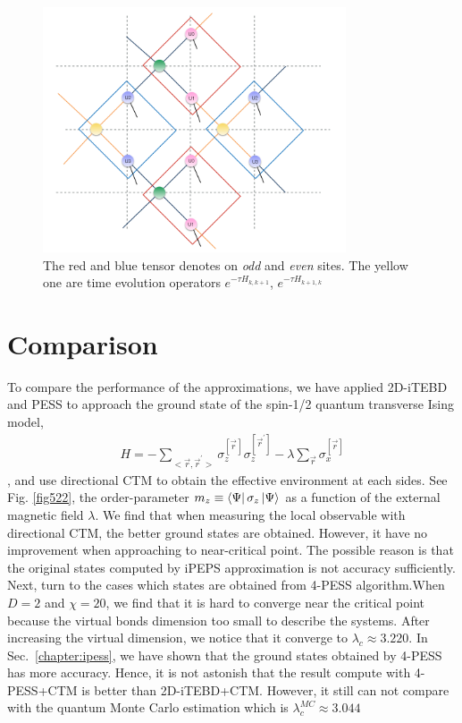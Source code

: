 \begin{figure}[ht]
	\centering
	\includegraphics[width=0.80\textwidth]{figures/fig521.png}
	\caption[The picture of the main idea of itebd.]{The red and blue tensor denotes on \textit{odd} and \textit{even} sites. The yellow one are time evolution operators $e^{-\tau H_{k,k+1}}$, $e^{-\tau H_{k+1,k}}$}
	\label{fig521}
\end{figure}

\section{Comparison}

To compare the performance of the approximations, we have applied 2D-iTEBD and PESS to approach the ground state of the spin-1/2 quantum transverse Ising model, 
\begin{align}
	H = -\sum_{<\vec{r},\vec{r}^{\prime}>}{\sigma_z^{[ \vec{r}^{} ]} \sigma_z^{[ \vec{r}^{\prime} ]}} - \lambda \sum_{\vec{r}}{\sigma_x^{[ \vec{r} ]}}
\end{align}
, and use directional CTM to obtain the effective environment at each sides. See Fig. \ref{fig522}, the order-parameter $m_z \equiv  \Bra{\Psi} \sigma_z \Ket{\Psi}$ as a function of the external magnetic field $\lambda$. We find that when measuring the local observable with directional CTM, the better ground states are obtained. However, it have no improvement when approaching to near-critical point. The possible reason is that 
the original states computed by iPEPS approximation is not accuracy sufficiently. Next, turn to the cases which states are obtained from 4-PESS algorithm.When $D=2$ and $\chi = 20$, we find that it is hard to converge near the critical point because the virtual bonds dimension too small to describe the systems. After increasing the virtual dimension, we notice that it converge to $\lambda_c \approx 3.220$. In Sec.~\ref{chapter:ipess}, we have shown that the ground states obtained by 4-PESS has more accuracy. Hence, it is not astonish that the result compute with 4-PESS+CTM is better than 2D-iTEBD+CTM. However, it still can not compare with  the quantum Monte Carlo estimation which is $\lambda^{MC}_c \approx 3.044$

